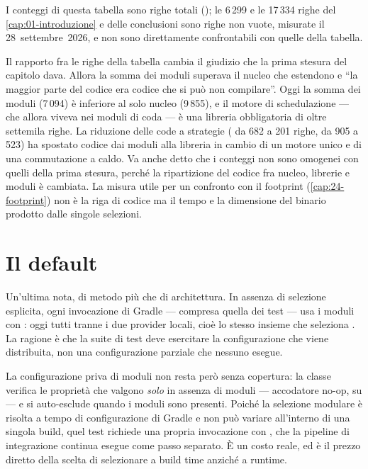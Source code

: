 I conteggi di questa tabella sono righe totali (); le 6\,299 e le
17\,334 righe del \cref{cap:01-introduzione} e delle conclusioni sono righe non vuote,
misurate il 28~settembre~2026, e non sono direttamente confrontabili con quelle
della tabella.

Il rapporto fra le righe della tabella cambia il giudizio che la prima stesura
del capitolo dava. Allora la somma dei moduli superava il nucleo che estendono
e ``la maggior parte del codice era codice che si pu\`o non compilare''. Oggi la
somma dei moduli (7\,094) \`e inferiore al solo nucleo (9\,855), e il motore di
schedulazione --- che allora viveva nei moduli di coda --- \`e una libreria
obbligatoria di oltre settemila righe. La riduzione delle code a strategie
( da 682 a 201 righe,  da 905 a 523) ha
spostato codice dai moduli alla libreria  in cambio di
un motore unico e di una commutazione a caldo. Va anche detto che i conteggi non
sono omogenei con quelli della prima stesura, perch\'e la ripartizione del
codice fra nucleo, librerie e moduli \`e cambiata. La misura utile per un confronto con il
footprint (\cref{cap:24-footprint}) non \`e la riga di codice ma il tempo e la
dimensione del binario prodotto dalle singole selezioni.

\section{Il default}

Un'ultima nota, di metodo pi\`u che di architettura. In assenza di selezione
esplicita, ogni invocazione di Gradle --- compresa quella dei test --- usa i
moduli con : oggi tutti tranne i due provider locali,
cio\`e lo stesso insieme che seleziona . La ragione \`e che la suite di
test deve esercitare la configurazione che viene distribuita, non una
configurazione parziale che nessuno esegue.

La configurazione priva di moduli non resta per\`o senza copertura: la classe
 verifica le propriet\`a che valgono \emph{solo} in
assenza di moduli --- accodatore no-op,  su  --- e si
auto-esclude quando i moduli sono presenti. Poich\'e la selezione modulare \`e
risolta a tempo di configurazione di Gradle e non pu\`o variare all'interno di
una singola build, quel test richiede una propria invocazione con
, che la pipeline di integrazione continua
esegue come passo separato. \`E un costo reale, ed \`e il prezzo diretto della
scelta di selezionare a build time anzich\'e a runtime.
